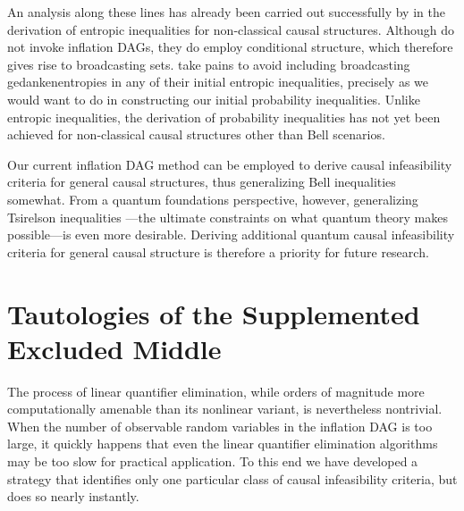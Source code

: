 {An analysis along these lines has already been carried out successfully by \citet{Chaves2015infoquantum} in the derivation of entropic inequalities for non-classical causal structures. Although \citet{Chaves2015infoquantum} do not invoke inflation DAGs, they do employ conditional structure, which therefore gives rise to broadcasting sets. \citet{Chaves2015infoquantum} take pains to avoid including broadcasting gedankenentropies in any of their initial entropic inequalities, precisely as we would want to do in constructing our initial probability inequalities. Unlike entropic inequalities, the derivation of probability inequalities has not yet been achieved for non-classical causal structures other than Bell scenarios. 

Our current inflation DAG method can be employed to derive causal infeasibility criteria for general causal structures, thus generalizing Bell inequalities somewhat. From a quantum foundations perspective, however, generalizing Tsirelson inequalities \cite{Tsirelson1980,Brunner2013Bell}---the ultimate constraints on what quantum theory makes possible---is even more desirable. Deriving additional quantum causal infeasibility criteria for general causal structure is therefore a priority for future research. 


\section{Tautologies of the Supplemented Excluded Middle}\label{sec:TSEM}

The process of linear quantifier elimination, while orders of magnitude more computationally amenable than its nonlinear variant, is nevertheless nontrivial. When the number of observable random variables in the inflation DAG is too large, it quickly happens that even the linear quantifier elimination algorithms may be too slow for practical application. To this end we have developed a strategy that identifies only one particular class of causal infeasibility criteria, but does so nearly instantly.

}
